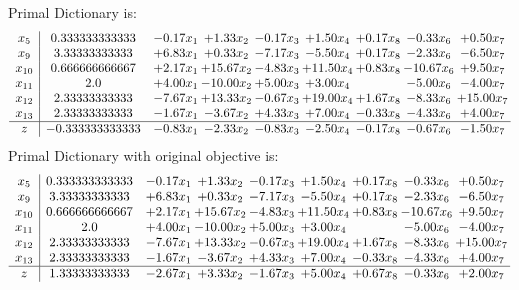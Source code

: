 \documentclass[8pt]{article}
\begin{document}
Primal Dictionary is:
\[\begin{array}{c| c c@{\hskip 2pt} c@{\hskip 2pt} c@{\hskip 2pt} c@{\hskip 2pt} c@{\hskip 2pt} c@{\hskip 2pt} c@{\hskip 2pt} }
 x_{5}   &  0.333333333333 & -0.17 x_{1} & +  1.33 x_{2} & -0.17 x_{3} & +  1.50 x_{4} & +  0.17 x_{8} & -0.33 x_{6} & +  0.50 x_{7}\\
 x_{9}   &  3.33333333333 & +  6.83 x_{1} & +  0.33 x_{2} & -7.17 x_{3} & -5.50 x_{4} & +  0.17 x_{8} & -2.33 x_{6} & -6.50 x_{7}\\
 x_{10}   &  0.666666666667 & +  2.17 x_{1} & + 15.67 x_{2} & -4.83 x_{3} & + 11.50 x_{4} & +  0.83 x_{8} & -10.67 x_{6} & +  9.50 x_{7}\\
 x_{11}   &  2.0 & +  4.00 x_{1} & -10.00 x_{2} & +  5.00 x_{3} & +  3.00 x_{4} &   & -5.00 x_{6} & -4.00 x_{7}\\
 x_{12}   &  2.33333333333 & -7.67 x_{1} & + 13.33 x_{2} & -0.67 x_{3} & + 19.00 x_{4} & +  1.67 x_{8} & -8.33 x_{6} & + 15.00 x_{7}\\
 x_{13}   &  2.33333333333 & -1.67 x_{1} & -3.67 x_{2} & +  4.33 x_{3} & +  7.00 x_{4} & -0.33 x_{8} & -4.33 x_{6} & +  4.00 x_{7}\\
\hline
z    &  -0.333333333333 & -0.83 x_{1} & -2.33 x_{2} & -0.83 x_{3} & -2.50 x_{4} & -0.17 x_{8} & -0.67 x_{6} & -1.50 x_{7}\\
\end{array}\]
Primal Dictionary with original objective is:
\[\begin{array}{c| c c@{\hskip 2pt} c@{\hskip 2pt} c@{\hskip 2pt} c@{\hskip 2pt} c@{\hskip 2pt} c@{\hskip 2pt} c@{\hskip 2pt} }
 x_{5}   &  0.333333333333 & -0.17 x_{1} & +  1.33 x_{2} & -0.17 x_{3} & +  1.50 x_{4} & +  0.17 x_{8} & -0.33 x_{6} & +  0.50 x_{7}\\
 x_{9}   &  3.33333333333 & +  6.83 x_{1} & +  0.33 x_{2} & -7.17 x_{3} & -5.50 x_{4} & +  0.17 x_{8} & -2.33 x_{6} & -6.50 x_{7}\\
 x_{10}   &  0.666666666667 & +  2.17 x_{1} & + 15.67 x_{2} & -4.83 x_{3} & + 11.50 x_{4} & +  0.83 x_{8} & -10.67 x_{6} & +  9.50 x_{7}\\
 x_{11}   &  2.0 & +  4.00 x_{1} & -10.00 x_{2} & +  5.00 x_{3} & +  3.00 x_{4} &   & -5.00 x_{6} & -4.00 x_{7}\\
 x_{12}   &  2.33333333333 & -7.67 x_{1} & + 13.33 x_{2} & -0.67 x_{3} & + 19.00 x_{4} & +  1.67 x_{8} & -8.33 x_{6} & + 15.00 x_{7}\\
 x_{13}   &  2.33333333333 & -1.67 x_{1} & -3.67 x_{2} & +  4.33 x_{3} & +  7.00 x_{4} & -0.33 x_{8} & -4.33 x_{6} & +  4.00 x_{7}\\
\hline
z    &  1.33333333333 & -2.67 x_{1} & +  3.33 x_{2} & -1.67 x_{3} & +  5.00 x_{4} & +  0.67 x_{8} & -0.33 x_{6} & +  2.00 x_{7}\\
\end{array}\]
\end{document}
